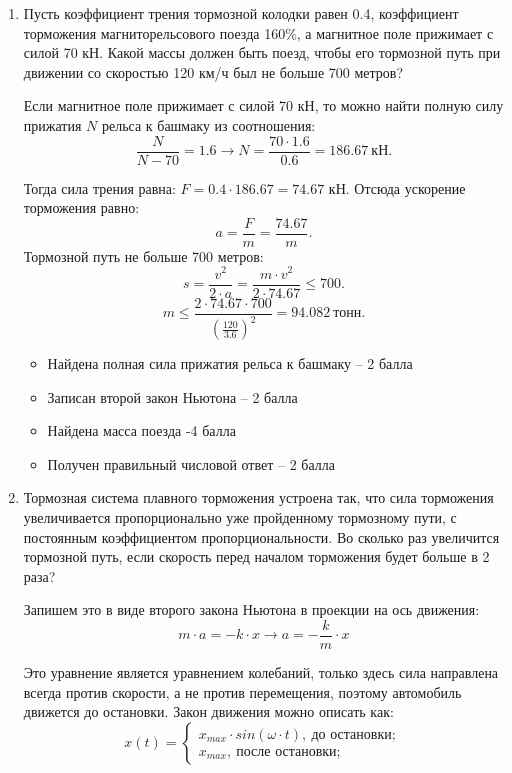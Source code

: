 \begin{enumerate}
    \item Пусть коэффициент трения тормозной колодки равен 0.4, коэффициент торможения магниторельсового поезда 160\%, а магнитное поле прижимает с силой 70 кН. Какой массы должен быть поезд, чтобы его тормозной путь при движении со скоростью 120 км/ч был не больше 700 метров?
    
    Если магнитное поле прижимает с силой 70 кН, то можно найти полную силу прижатия $N$ рельса к башмаку из соотношения: $$\frac{N}{N-70}=1.6 \rightarrow N=\frac{70 \cdot 1.6}{0.6}= 186.67 \: \text{кН}.$$
    
    Тогда сила трения равна: $F=0.4 \cdot 186.67=74.67$ кН. Отсюда ускорение торможения равно: $$a=\frac{F}{m}=\frac{74.67}{m}.$$ Тормозной путь не больше 700 метров: $$s=\frac{v^2}{2 \cdot a}=\frac{m \cdot v^2}{2 \cdot 74.67} \leq 700.$$
    $$m \leq \frac{2 \cdot 74.67 \cdot 700}{\left(\frac{120}{3.6}\right)^2} =94.082 \: \text{тонн}.$$


    \markSection

    \begin{itemize}
	    \item Найдена полная сила прижатия рельса к башмаку – 2 балла
	    \item Записан второй закон Ньютона – 2 балла
	    \item Найдена масса поезда -4 балла
	    \item Получен правильный числовой ответ – 2 балла
    \end{itemize}

    \item Тормозная система плавного торможения устроена так, что сила торможения увеличивается пропорционально уже пройденному тормозному пути, с постоянным коэффициентом пропорциональности. Во сколько раз увеличится тормозной путь, если скорость перед началом торможения будет больше в 2 раза?
    
    Запишем это в виде второго закона Ньютона в проекции на ось движения:
    $$m \cdot a=-k \cdot x \rightarrow a= -\frac{k}{m} \cdot x$$

    Это уравнение является уравнением колебаний, только здесь сила направлена всегда против скорости, а не против перемещения, поэтому автомобиль движется до остановки. 
    Закон движения можно описать как:
    $$ x(t)=\left\{
        \begin{aligned}
            x_{max} \cdot sin(\omega \cdot t), \: \text{до остановки};\\
            x_{max}, \: \text{после остановки};
        \end{aligned}
    \right. $$


\end{enumerate}
